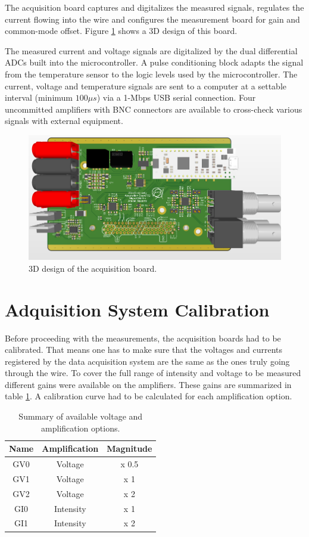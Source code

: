 The acquisition board captures and digitalizes the measured signals, regulates the current flowing into the wire and configures the measurement board for gain and common-mode offset. Figure \ref{fig:AdquisitionBoard} shows a 3D design of this board. 

The measured current and voltage signals are digitalized by the dual differential ADCs built into the microcontroller. A pulse conditioning block adapts the signal from the temperature sensor to the logic levels used by the microcontroller. The current, voltage and temperature signals are sent to a computer at a settable interval (minimum $100 \mu s$) via a 1-Mbps USB serial connection. Four uncommitted amplifiers with BNC connectors are available to cross-check various signals with external equipment. 

\begin{figure}[h]
    \centering
    \includegraphics[width=0.8\columnwidth]{3DBoardDesigns/AdquisitionBoard.png}
    \caption{3D design of the acquisition board.}
    \label{fig:AdquisitionBoard}
\end{figure}

\section{Adquisition System Calibration}

Before proceeding with the measurements, the acquisition boards had to be calibrated. That means one has to make sure that the voltages and currents registered by the data acquisition system are the same as the ones truly going through the wire. To cover the full range of intensity and voltage to be measured different gains were available on the amplifiers. These gains are summarized in table \ref{tab:AvGains}. A calibration curve had to be calculated for each amplification option. 

\begin{table}[h]
    \centering
    \begin{tabular}{ccc}
    \hline
    Name & Amplification & Magnitude \\ \hline
    GV0  & Voltage       & x 0.5     \\
    GV1  & Voltage       & x 1       \\
    GV2  & Voltage       & x 2       \\
    GI0  & Intensity     & x 1       \\
    GI1  & Intensity     & x 2       \\ \hline
    \end{tabular}
    \caption{Summary of available voltage and amplification options. }
    \label{tab:AvGains}
\end{table}

